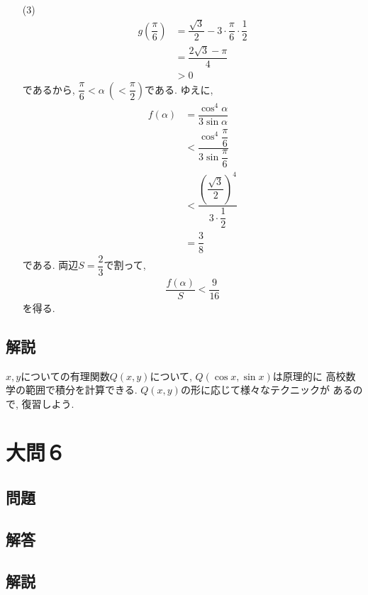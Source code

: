 \documentclass[dvipdfmx,a4paper]{jsarticle}
\newcommand{\al}{\alpha}
\newcommand{\2}{I\hspace{-1pt}I}
\newcommand{\3}{I\hspace{-1pt}I\hspace{-1pt}I}
\begin{document}
\begin{itemize}
        \item [(3)] 
        \begin{align*}
            g\left(\dfrac{\pi}{6}\right) 
            &= \dfrac{\sqrt{3}}{2} -3 \cdot \dfrac{\pi}{6} \cdot \dfrac{1}{2} \\
            &= \dfrac{2\sqrt{3} - \pi }{4} \\
            & >0
        \end{align*}
        であるから, $\dfrac{\pi}{6} < \al   \ \left(< \dfrac{\pi}{2}\right)$である. ゆえに, 
        \begin{align*}
            f(\al) 
            &= \dfrac{\cos ^4 \al}{3\sin \al} \\
            &< \dfrac{\cos ^4 \dfrac{\pi}{6}}{3\sin \dfrac{\pi}{6}} \\
            &< \dfrac{\left(\dfrac{\sqrt{3}}{2}\right)^4}{3\cdot \dfrac{1}{2}} \\
            & = \dfrac{3}{8}
        \end{align*}
        である. 両辺$S=\dfrac{2}{3}$で割って, 
        \begin{align*}
            \dfrac{f(\al)}{S} < \dfrac{9}{16}
        \end{align*}
        を得る. 
    \end{itemize}

    \subsection{解説}
    $x,y$についての有理関数$Q(x,y)$について, $Q(\cos x, \sin x)$は原理的に
    高校数学の範囲で積分を計算できる. $Q(x,y)$の形に応じて様々なテクニックが
    あるので, 復習しよう. 



    \section{大問６}
    \subsection{問題}

    \subsection{解答}

    \subsection{解説}
\end{document}
